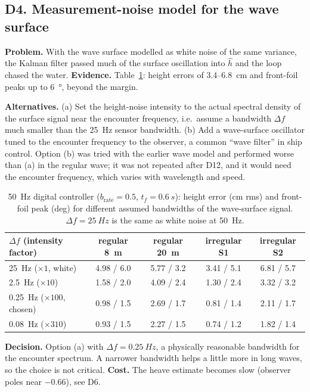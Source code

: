 \documentclass[11pt,a4paper]{article}
\begin{document}
\subsection{D4. Measurement-noise model for the wave surface}

\textbf{Problem.} With the wave surface modelled as white noise of the same
variance, the Kalman filter passed much of the surface oscillation into
$\hat h$ and the loop chased the water. \textbf{Evidence.}
Table~\ref{tab:rn}: height errors of 3.4--\SI{6.8}{cm} and front-foil peaks up to
\SI{6}{\degree}, beyond the margin.

\textbf{Alternatives.} (a) Set the height-noise intensity to the actual spectral
density of the surface signal near the encounter frequency, i.e.\ assume a
bandwidth $\Delta f$ much smaller than the \SI{25}{Hz} sensor bandwidth. (b) Add a
wave-surface oscillator tuned to the encounter frequency to the observer, a
common ``wave filter'' in ship control. Option (b) was tried with the earlier
wave model and performed worse than (a) in the regular wave; it was not repeated
after D12, and it would need the encounter frequency, which varies with
wavelength and speed.

\begin{table}[htbp]
\centering
\small
\caption{\SI{50}{Hz} digital controller ($b_{\mathrm{rate}}=0.5$, $t_f=\SI{0.6}{s}$):
height error (cm rms) and front-foil peak (deg) for different assumed
bandwidths of the wave-surface signal. $\Delta f=\SI{25}{Hz}$ is the same as
white noise at \SI{50}{Hz}.}
\label{tab:rn}
\begin{tabular}{@{}lcccc@{}}
\toprule
$\Delta f$ (intensity factor) & regular \SI{8}{m} & regular \SI{20}{m} & irregular S1 & irregular S2 \\ \midrule
\SI{25}{Hz} ($\times1$, white) & 4.98 / 6.0 & 5.77 / 3.2 & 3.41 / 5.1 & 6.81 / 5.7 \\
\SI{2.5}{Hz} ($\times10$) & 1.58 / 2.0 & 4.09 / 2.4 & 1.30 / 2.4 & 3.32 / 3.2 \\
\SI{0.25}{Hz} ($\times100$, chosen) & 0.98 / 1.5 & 2.69 / 1.7 & 0.81 / 1.4 & 2.11 / 1.7 \\
\SI{0.08}{Hz} ($\times310$) & 0.93 / 1.5 & 2.27 / 1.5 & 0.74 / 1.2 & 1.82 / 1.4 \\
\bottomrule
\end{tabular}
\end{table}

\textbf{Decision.} Option (a) with $\Delta f=\SI{0.25}{Hz}$, a physically
reasonable bandwidth for the encounter spectrum. A narrower bandwidth helps a
little more in long waves, so the choice is not critical. \textbf{Cost.} The
heave estimate becomes slow (observer poles near $-0.66$), see D6.
\end{document}
